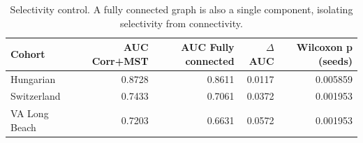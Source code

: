 \begin{table}[t]
\centering
\caption{Selectivity control. A fully connected graph is also a single component, isolating selectivity from connectivity.}
\label{tab:mstselect}
\footnotesize
\begin{tabular}{lrrrr}
\toprule
Cohort & AUC Corr+MST & AUC Fully connected & $\Delta$AUC & Wilcoxon p (seeds) \\
\midrule
Hungarian & 0.8728 & 0.8611 & 0.0117 & 0.005859 \\
Switzerland & 0.7433 & 0.7061 & 0.0372 & 0.001953 \\
VA Long Beach & 0.7203 & 0.6631 & 0.0572 & 0.001953 \\
\bottomrule
\end{tabular}
\end{table}
